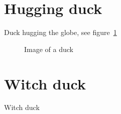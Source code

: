 \newpage

\IfDocumentMetadataT{}

\section{Hugging duck}

Duck hugging the globe, see figure~\ref{fig:duck}

\begin{figure}
\caption{Image of a duck\label{fig:duck}}
\end{figure}


\section{Witch duck}

Witch duck

